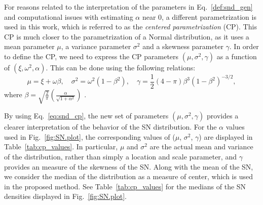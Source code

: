\documentclass[11pt, oneside]{article}
\begin{document}
%
For reasons related to the interpretation of the parameters in Eq.~\ref{def:snd_gen} and computational issues with estimating $\alpha$ near 0, a different parametrization is used in this work, which is referred to as the \emph{centered parametrization} (CP).  This CP is much closer to the parametrization of a Normal distribution, as it uses a mean parameter $\mu$, a variance parameter $\sigma^2$ and a skewness parameter $\gamma$. In order to define the CP, we need to express the CP parameters $(\mu, \sigma^2, \gamma)$ as a function of $(\xi, \omega^2, \alpha)$. This can be done using the following relations:
%
\begin{equation} \label{eq:snd_cp}
\mu = \xi + \omega \beta, \quad \sigma^{2} = \omega^{2}(1-\beta^2), \quad \gamma = \frac{1}{2}(4-\pi) \beta^{3}\left(1-\beta^2\right)^{-3/2},
\end{equation}
%
where $\beta = \sqrt{\frac{2}{\pi}}\left(\frac{\alpha}{\sqrt{1+\alpha^2}}\right)$ \citep[e.g.][]{Arellano-2010}.

By using Eq.~\ref{eq:snd_cp}, the new set of parameters $(\mu, \sigma^2, \gamma)$ provides a clearer interpretation of the behavior of the SN distribution. For the $\alpha$ values used in Fig.~\ref{fig:SN.plot}, the corresponding values of ($\mu$, $\sigma^2$, $\gamma$) are displayed in Table~\ref{tab:cp_values}.  In particular, $\mu$ and $\sigma^2$ are the actual mean and variance of the distribution, rather than simply a location and scale parameter, and $\gamma$ provides an measure of the skewness of the SN. 
Along with the mean of the SN, we consider the median of the distribution as a measure of center, which is used in the proposed method.  See Table~\ref{tab:cp_values} for the medians of the SN densities displayed in Fig.~\ref{fig:SN.plot}.
%
\end{document}
